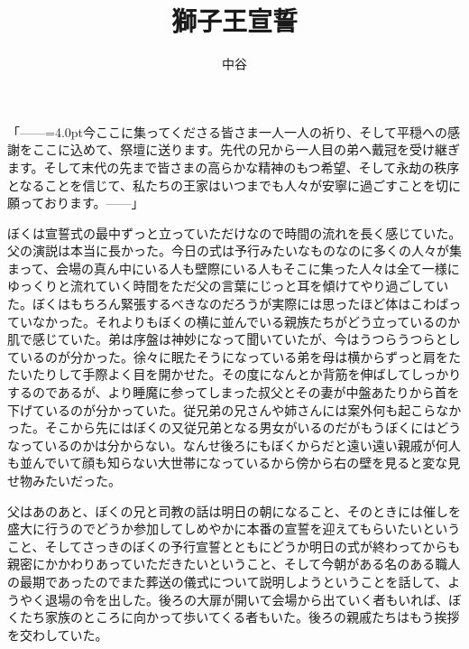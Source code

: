 \documentclass[b5j,twoside,twocolumn]{utarticle}
\title{獅子王宣誓}
\author{中谷}
\date{\vspace{-5mm}}
\makeatletter
\def\yakuchu{%
\@ifnextchar[\@xfootnote %
{\stepcounter{yakuchu}%
\protected@xdef\@thefnmark{\theyakuchu}%
\@footnotemark\@footnotetext}}
\makeatother
\begin{document}
\maketitle

\setlength{\footskip}{-2mm}
\chead[]{}
\rhead[獅子王宣誓]{}
\lfoot[]{\thepage{}}
\cfoot[]{}
\rfoot[\thepage{}]{}

\let\yakuchu=\endnote
\renewcommand{\footnoterule}{\noindent\rule{100mm}{0.3mm}\vskip2mm}
\thispagestyle{fancy}

「\tbaselineshift=2.5pt------\tbaselineshift=4.0pt今ここに集ってくださる皆さま一人一人の祈り、そして平穏への感謝をここに込めて、祭壇に送ります。先代の兄から一人目の弟へ戴冠を受け継ぎます。そして末代の先まで皆さまの高らかな精神のもつ希望、そして永劫の秩序となることを信じて、私たちの王家はいつまでも人々が安寧に過ごすことを切に願っております。\tbaselineshift=2.5pt------\tbaselineshift=4.0pt」


ぼくは宣誓式の最中ずっと立っていただけなので時間の流れを長く感じていた。父の演説は本当に長かった。今日の式は予行みたいなものなのに多くの人々が集まって、会場の真ん中にいる人も壁際にいる人もそこに集った人々は全て一様にゆっくりと流れていく時間をただ父の言葉にじっと耳を傾けてやり過ごしていた。ぼくはもちろん緊張するべきなのだろうが実際には思ったほど体はこわばっていなかった。それよりもぼくの横に並んでいる親族たちがどう立っているのか肌で感じていた。弟は序盤は神妙になって聞いていたが、今はうつらうつらとしているのが分かった。徐々に眠たそうになっている弟を母は横からずっと肩をたたいたりして手際よく目を開かせた。その度になんとか背筋を伸ばしてしっかりするのであるが、より睡魔に参ってしまった叔父とその妻が中盤あたりから首を下げているのが分かっていた。従兄弟の兄さんや姉さんには案外何も起こらなかった。そこから先にはぼくの又従兄弟となる男女がいるのだがもうぼくにはどうなっているのかは分からない。なんせ後ろにもぼくからだと遠い遠い親戚が何人も並んでいて顔も知らない大世帯になっているから傍から右の壁を見ると変な見せ物みたいだった。


父はあのあと、ぼくの兄と司教の話は明日の朝になること、そのときには催しを盛大に行うのでどうか参加してしめやかに本番の宣誓を迎えてもらいたいということ、そしてさっきのぼくの予行宣誓とともにどうか明日の式が終わってからも親密にかかわりあっていただきたいということ、そして今朝がある名のある職人の最期であったのでまた葬送の儀式について説明しようということを話して、ようやく退場の令を出した。後ろの大扉が開いて会場から出ていく者もいれば、ぼくたち家族のところに向かって歩いてくる者もいた。後ろの親戚たちはもう挨拶を交わしていた。
\end{document}
